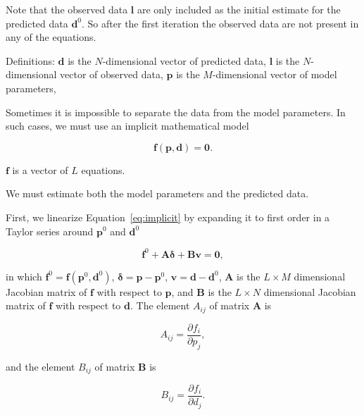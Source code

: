 \documentclass[onecolumn]{article}
\begin{document}
Note that the observed data $\mathbf{l}$
are only included
as the initial estimate
for the predicted data $\mathbf{d}^0$.
So after the first iteration
the observed data are not present
in any of the equations.

Definitions:
$\mathbf{d}$ is the $N$-dimensional vector of predicted data,
$\mathbf{l}$ is the $N$-dimensional vector of observed data,
$\mathbf{p}$ is the $M$-dimensional vector of model parameters,

Sometimes it is impossible to separate the data from the model parameters.
In such cases,
we must use an implicit mathematical model

\begin{equation}
    \mathbf{f}(\mathbf{p}, \mathbf{d}) = \mathbf{0}.
    \label{eq:implicit}
\end{equation}

$\mathbf{f}$ is a vector of $L$ equations.

We must estimate both the model parameters and the predicted data.

First, we linearize Equation~\ref{eq:implicit} by expanding it to first order
in a Taylor series around $\mathbf{p}^0$ and $\mathbf{d}^0$

\begin{equation}
    \mathbf{f}^0 + \mathbf{A}\mathbf{\delta} + \mathbf{B}\mathbf{v} =
    \mathbf{0},
    \label{eq:implicit-taylor}
\end{equation}

\noindent
in which
$\mathbf{f}^0 = \mathbf{f}(\mathbf{p}^0, \mathbf{d}^0)$,
$\mathbf{\delta} = \mathbf{p} - \mathbf{p}^0$,
$\mathbf{v} = \mathbf{d} - \mathbf{d}^0$,
$\mathbf{A}$ is
the $L \times M$ dimensional Jacobian matrix of $\mathbf{f}$
with respect to $\mathbf{p}$,
and
$\mathbf{B}$ is
the $L \times N$ dimensional Jacobian matrix of $\mathbf{f}$
with respect to $\mathbf{d}$.
The element $A_{ij}$ of matrix $\mathbf{A}$ is

\begin{equation}
    A_{ij} = \dfrac{\partial f_i}{\partial p_j},
    \label{eq:A}
\end{equation}

\noindent
and the element $B_{ij}$ of matrix $\mathbf{B}$ is

\begin{equation}
    B_{ij} = \dfrac{\partial f_i}{\partial d_j}.
    \label{eq:B}
\end{equation}


\end{document}
